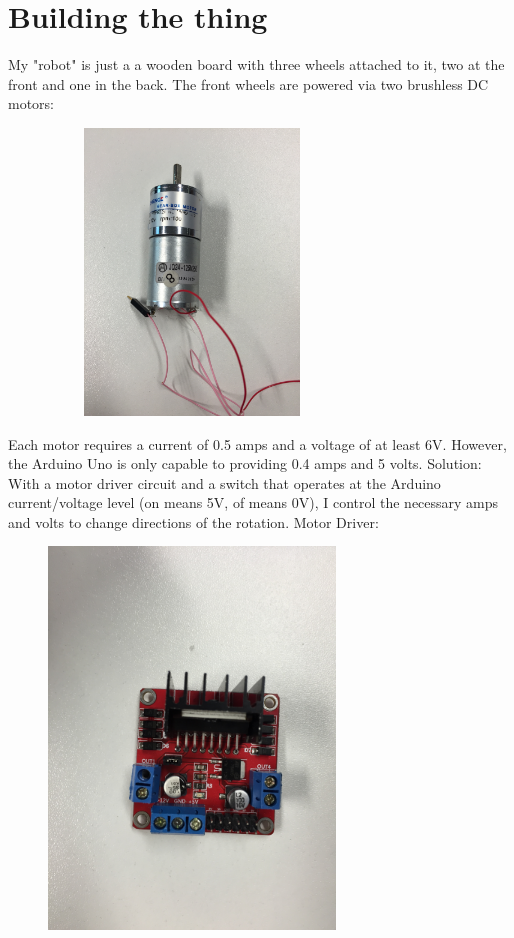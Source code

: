 \documentclass[final,3p,times,twocolumn]{elsarticle}
\begin{document}
\section{Building the thing}
My "robot" is just a a wooden board with three wheels attached to it, two at the front and one in the back.
The front wheels are powered via two brushless DC motors:
\begin{figure}[h!]
\includegraphics[trim={5cm 30cm 25cm 10cm}, clip, width=3in, height=3in]{./media/motor.jpg}
\end{figure}
Each motor requires a current of 0.5 amps and a voltage of at least 6V.
However, the Arduino Uno is only capable to providing 0.4 amps and 5 volts.
Solution:
With a motor driver circuit and a switch that operates at the Arduino current/voltage level (on means 5V, of means 0V),  I control the necessary amps and volts to change directions of the rotation.
Motor Driver:
\begin{figure}[h!]
\includegraphics[trim={0cm 0cm 0cm 0cm}, clip, width=3in]{./media/motorDriver.jpg}
\end{figure}
\end{document}
